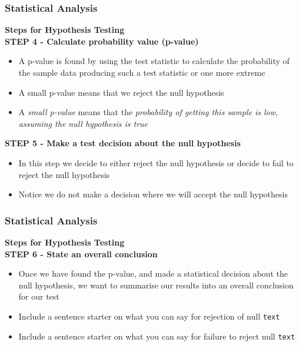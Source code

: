 \documentclass{beamer}
\begin{document}

\begin{frame}
\frametitle{Statistical Analysis}
\textbf{Steps for Hypothesis Testing}\\
\vspace{0.3cm}
\textbf{STEP 4 - Calculate probability value (p-value)}
\vspace{0.2cm}
\begin{itemize}
\item A p-value is found by using the test statistic to calculate the probability of the sample data producing such a test statistic or one more extreme
\vspace{0.2cm}
\item A small p-value means that we reject the null hypothesis
\vspace{0.2cm}
\item A \textit{small p-value} means that the \textit{probability of getting this sample is low, assuming the null hypothesis is true} 
\end{itemize}
\vspace{0.2cm}
\textbf{STEP 5 - Make a test decision about the null hypothesis}
\vspace{0.2cm}
\begin{itemize}
\item In this step we decide to either reject the null hypothesis or decide to fail to reject the null hypothesis
\vspace{0.2cm}
\item Notice we do not make a decision where we will accept the null hypothesis
\end{itemize}
\end{frame}


\begin{frame}[fragile]
\frametitle{Statistical Analysis}
\textbf{Steps for Hypothesis Testing}\\
\vspace{0.3cm}
\textbf{STEP 6 - State an overall conclusion}
\vspace{0.2cm}
\begin{itemize}
\item Once we have found the p-value, and made a statistical decision about the null hypothesis, we want to summarise our results into an overall conclusion for our test
\vspace{0.2cm}
\item Include a sentence starter on what you can say for rejection of null \verb|text|
\vspace{0.2cm}
\item Include a sentence starter on what you can say for failure to reject null \verb|text|
\end{itemize}
\end{frame}
\end{document}
